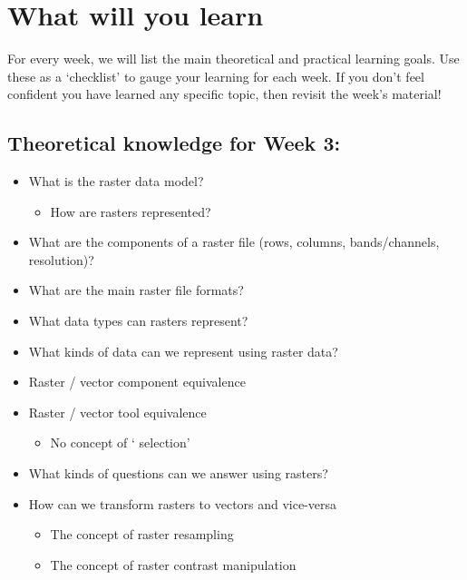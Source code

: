 \documentclass[
  letterpaper,
  DIV=11,
  numbers=noendperiod]{scrreprt}
\providecommand{\tightlist}{%
  \setlength{\itemsep}{0pt}\setlength{\parskip}{0pt}}\usepackage{longtable,booktabs,array}
\begin{document}
\section*{What will you learn}\label{what-will-you-learn-2}


For every week, we will list the main theoretical and practical learning
goals. Use these as a `checklist' to gauge your learning for each week.
If you don't feel confident you have learned any specific topic, then
revisit the week's material!

\subsection*{Theoretical knowledge for Week
3:}\label{theoretical-knowledge-for-week-3}

\begin{itemize}
\tightlist
\item
  What is the raster data model?

  \begin{itemize}
  \tightlist
  \item
    How are rasters represented?
  \end{itemize}
\item
  What are the components of a raster file (rows, columns,
  bands/channels, resolution)?
\item
  What are the main raster file formats?
\item
  What data types can rasters represent?
\item
  What kinds of data can we represent using raster data?
\item
  Raster / vector component equivalence
\item
  Raster / vector tool equivalence

  \begin{itemize}
  \tightlist
  \item
    No concept of ` selection'
  \end{itemize}
\item
  What kinds of questions can we answer using rasters?
\item
  How can we transform rasters to vectors and vice-versa

  \begin{itemize}
  \tightlist
  \item
    The concept of raster resampling
  \item
    The concept of raster contrast manipulation
  \end{itemize}
\end{itemize}
\end{document}
